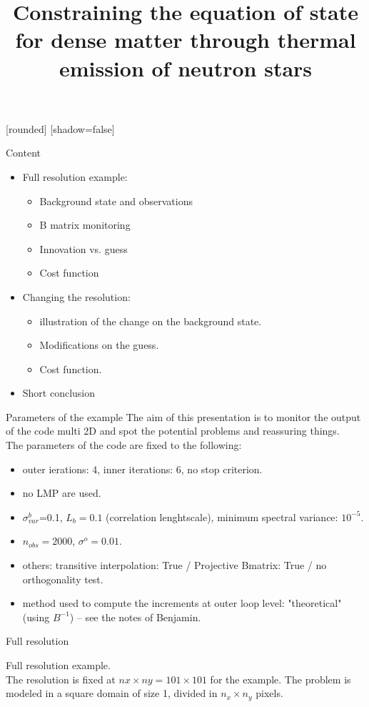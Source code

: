 \documentclass[francais]{beamer}
\title[Nicolas Baillot d'Etivaux]{Constraining the equation of state for dense matter through thermal emission of neutron stars}
\begin{document}
[rounded]%
[shadow=false]


\begin{frame}{Content}
\begin{itemize}
\item Full resolution example:
\begin{itemize}
\item Background state and observations
\item B matrix monitoring
\item Innovation vs. guess
\item Cost function
\end{itemize}
\item Changing the resolution:
\begin{itemize}
\item illustration of the change on the background state.
\item Modifications on the guess.
\item Cost function.
\end{itemize}
\item Short conclusion
\end{itemize}
\end{frame}

\begin{frame}{Parameters of the example}
The aim of this presentation is to monitor the output of the code multi 2D and spot the potential problems and reassuring things.\\
The parameters of the code are fixed to the following:\\

\begin{itemize}
\item outer ierations: 4, inner iterations: 6, no stop criterion.
\item no LMP are used.
\item $\sigma^b_{var}$=0.1, $L_b=0.1$ (correlation lenghtscale), minimum spectral variance: $10^{-5}$.
\item $n_{obs}=2000$, $\sigma^o=0.01$.
\item others: transitive interpolation: True / Projective Bmatrix: True / no orthogonality test.
\item method used to compute the increments at outer loop level: "theoretical" (using $B^{-1}$) -- see the notes of Benjamin.
\end{itemize}
\end{frame}

\begin{frame}{Full resolution}
\begin{center}
{\huge Full resolution example.}\\
\vspace{+1cm}
The resolution is fixed at $nx\times ny=101 \times 101$ for the example. The problem is modeled in a square domain of size 1, divided in $n_x \times n_y$ pixels.\\
\end{center}
\end{frame}
\end{document}

